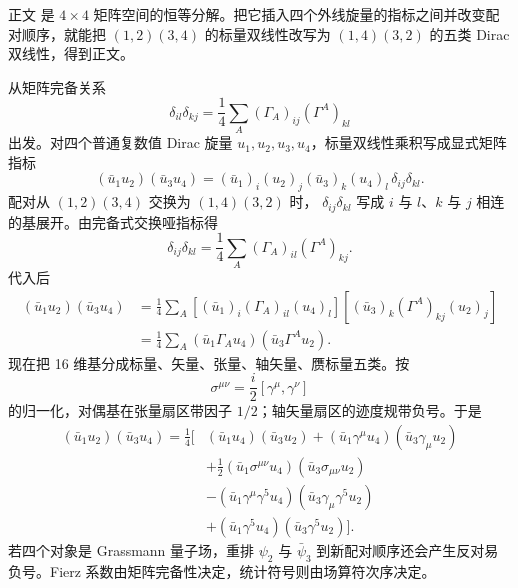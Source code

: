 \begin{derivation}

正文 是 $4\times4$ 矩阵空间的恒等分解。把它插入四个外线旋量的指标之间并改变配对顺序，就能把 $(1,2)(3,4)$ 的标量双线性改写为 $(1,4)(3,2)$ 的五类 Dirac 双线性，得到正文。



从矩阵完备关系
\begin{equation*}
\delta_{il}\delta_{kj}
=\frac14\sum_A(\Gamma_A)_{ij}(\Gamma^A)_{kl}
\end{equation*}
出发。对四个普通复数值 Dirac 旋量 $u_1,u_2,u_3,u_4$，标量双线性乘积写成显式矩阵指标
\begin{equation*}
(\bar u_1u_2)(\bar u_3u_4)
=(\bar u_1)_i(u_2)_j(\bar u_3)_k(u_4)_l\,
\delta_{ij}\delta_{kl}.
\end{equation*}
配对从 $(1,2)(3,4)$ 交换为 $(1,4)(3,2)$ 时， $\delta_{ij}\delta_{kl}$ 写成 $i$ 与 $l$、$k$ 与 $j$ 相连的基展开。由完备式交换哑指标得
\begin{equation*}
\delta_{ij}\delta_{kl}
=\frac14\sum_A(\Gamma_A)_{il}(\Gamma^A)_{kj}.
\end{equation*}
代入后
\begin{align*}
(\bar u_1u_2)(\bar u_3u_4)
&=\frac14\sum_A
[(\bar u_1)_i(\Gamma_A)_{il}(u_4)_l]
[(\bar u_3)_k(\Gamma^A)_{kj}(u_2)_j]\\
&=\frac14\sum_A
(\bar u_1\Gamma_Au_4)(\bar u_3\Gamma^Au_2).
\end{align*}
现在把 16 维基分成标量、矢量、张量、轴矢量、赝标量五类。按
\begin{equation*}
\sigma^{\mu\nu}=\frac{i}{2}[\gamma^\mu,\gamma^\nu]
\end{equation*}
的归一化，对偶基在张量扇区带因子 $1/2$；轴矢量扇区的迹度规带负号。于是
\begin{align*}
(\bar u_1u_2)(\bar u_3u_4)
=\frac14\Big[&
(\bar u_1u_4)(\bar u_3u_2)
+(\bar u_1\gamma^\mu u_4)(\bar u_3\gamma_\mu u_2)\\
&+\frac12(\bar u_1\sigma^{\mu\nu}u_4)
(\bar u_3\sigma_{\mu\nu}u_2)\\
&-(\bar u_1\gamma^\mu\gamma^5u_4)
(\bar u_3\gamma_\mu\gamma^5u_2)\\
&+(\bar u_1\gamma^5u_4)(\bar u_3\gamma^5u_2)
\Big].
\end{align*}
若四个对象是 Grassmann 量子场，重排 $\psi_2$ 与 $\bar\psi_3$ 到新配对顺序还会产生反对易负号。Fierz 系数由矩阵完备性决定，统计符号则由场算符次序决定。
\end{derivation}

